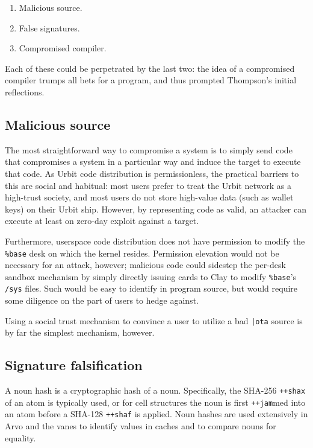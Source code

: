\documentclass[twoside]{article}
\begin{document}
\begin{enumerate}
  \item  Malicious source.
  \item  False signatures.
  \item  Compromised compiler.
\end{enumerate}

\noindent
Each of these could be perpetrated by the last two:  the idea of a compromised compiler trumps all bets for a program, and thus prompted Thompson's initial reflections.

\subsection{Malicious source}

The most straightforward way to compromise a system is to simply send code that compromises a system in a particular way and induce the target to execute that code.  As Urbit code distribution is permissionless, the practical barriers to this are social and habitual:  most users prefer to treat the Urbit network as a high-trust society, and most users do not store high-value data (such as wallet keys) on their Urbit ship.  However, by representing code as valid, an attacker can execute at least on zero-day exploit against a target.

Furthermore, userspace code distribution does not have permission to modify the \lstinline[style=inlinecode]{%base} desk on which the kernel resides.  Permission elevation would not be necessary for an attack, however; malicious code could sidestep the per-desk sandbox mechanism by simply directly issuing cards to Clay to modify \lstinline[style=inlinecode]{%base}'s \lstinline[style=inlinecode]{/sys} files.  Such would be easy to identify in program source, but would require some diligence on the part of users to hedge against.

Using a social trust mechanism to convince a user to utilize a bad \lstinline[style=inlinecode]{|ota} source is by far the simplest mechanism, however.

\subsection{Signature falsification}

A noun hash is a cryptographic hash of a noun.  Specifically, the SHA-256 \lstinline[style=inlinecode]{++shax} of an atom is typically used, or for cell structures the noun is first \lstinline[style=inlinecode]{++jam}med into an atom before a SHA-128 \lstinline[style=inlinecode]{++shaf} is applied.  Noun hashes are used extensively in Arvo and the vanes to identify values in caches and to compare nouns for equality.
\end{document}
